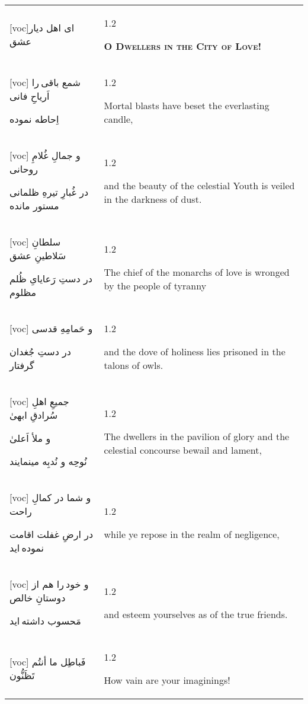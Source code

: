 \documentclass[11pt]{article}
\makeatletter
\newenvironment{orig}
  {\begin{farsi}[voc]}
  {\end{farsi}}
\newenvironment{trans}
  {\Large\begin{spacing}{1.2}\raggedright}
  {\end{spacing}}
\newenvironment{word}
  {\begin{tabular}[t]{p{2.75in}@{\hspace{3em}}p{2.75in}}}
  {\end{tabular}}
\newcommand{\ayat}[2]{\begin{orig}#1\end{orig} & \begin{trans}#2\end{trans}}
\newcommand{\heading}[2]{\textsc{\textbf{#1}} %
}
\makeatother
\begin{document}
\begin{word}
\ayat{ای اهل ديار عشق}{\heading{O Dwellers in the City of Love!}{}} \vspace{-1ex}\\ \ayat{
شمع باقی را اَرياحِ فانی

اِحاطه نموده
}{Mortal blasts have beset the everlasting candle,} \vspace{-1ex}\\ \ayat{
و جمالِ غُلامِ روحانی

در غُبارِ تيرهِ ظلمانی مستور مانده
}{and the beauty of the celestial Youth is veiled in the darkness of
  dust.} \vspace{-1ex}\\ \ayat{
سلطانِ سَلاطينِ عشق

در دستِ رَعايایِ ظُلم مظلوم
}{The chief of the monarchs of love is wronged by the people of
  tyranny} \vspace{-1ex}\\ \ayat{
و حَمامِهِ قدسی

در دستِ جُغدان گرفتار
}{and the dove of holiness lies prisoned in the talons of owls.} \vspace{-1ex}\\ \ayat{
جميعِ اهلِ سُرادقِ ابهیٰ

و ملأ اَعلیٰ

نُوحِه و نُدبِه مينمايند
}{The dwellers in the pavilion of glory and the celestial concourse bewail and
  lament,} \\ \ayat{
و شما در کمالِ راحت

در ارضِ غفلت اقامت نموده ايد
}{while ye repose in the realm of negligence,} \vspace{-1ex}\\ \ayat{
و خود را هم از دوستانِ خالص

مَحسوب داشته ايد
}{ and esteem yourselves as of the true friends.} \vspace{-1ex}\\ \ayat{
فَباطِل ما أنتُم تَظَنُّون
}{How vain are your imaginings!}
\end{word}


\end{document}

